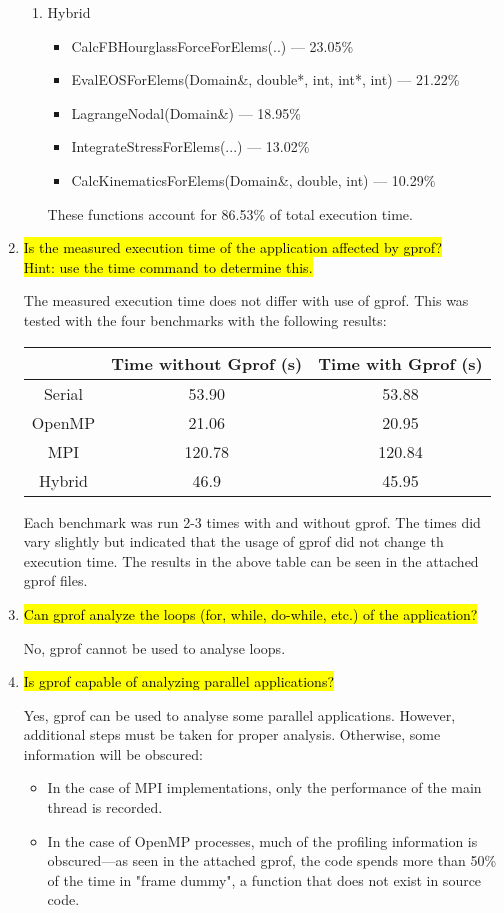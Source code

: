 \documentclass{article}
\begin{document}
\begin{enumerate}
\begin{enumerate}
		\item Hybrid
		\begin{itemize}
			\item CalcFBHourglassForceForElems(..) --- 23.05\%
			\item EvalEOSForElems(Domain\&, double*, int, int*, int) --- 21.22\%
			\item LagrangeNodal(Domain\&) --- 18.95\%
			\item IntegrateStressForElems(...) --- 13.02\%
			\item CalcKinematicsForElems(Domain\&, double, int) --- 10.29\%
		\end{itemize}
		These functions account for 86.53\% of total execution time.
	\end{enumerate}

	\item \hl{Is the measured execution time of the application affected by gprof? \\Hint: use the time command to determine this.}

	The measured execution time does not differ with use of gprof. This was tested with the four benchmarks with the following results:
	\begin{center}
		\begin{tabular}{|c|c|c|}
			\hline
			&Time without Gprof (s) & Time with Gprof (s)\\
			\hline
			Serial &53.90&53.88\\ \hline
			OpenMP &21.06&20.95\\ \hline
			MPI &120.78&120.84\\ \hline
			Hybrid &46.9&45.95\\ \hline
		\end{tabular}
	\end{center}
	Each benchmark was run 2-3 times with and without gprof. The times did vary slightly but indicated that the usage of gprof did not change th execution time. The results in the above table can be seen in the attached gprof files.

	\item \hl{Can gprof analyze the loops (for, while, do-while, etc.) of the application?}

	No, gprof cannot be used to analyse loops.
	
	\item \hl{Is gprof capable of analyzing parallel applications?}

	Yes, gprof can be used to analyse some parallel applications. However, additional steps must be taken for proper analysis. Otherwise, some information will be obscured:
	\begin{itemize}
	\item In the case of MPI implementations, only the performance of the main thread is recorded. 
	\item In the case of OpenMP processes, much of the profiling information is obscured---as seen in the attached gprof, the code spends more than 50\% of the time in "frame dummy", a function that does not exist in source code.
	\end{itemize}


\end{enumerate}
\end{document}
